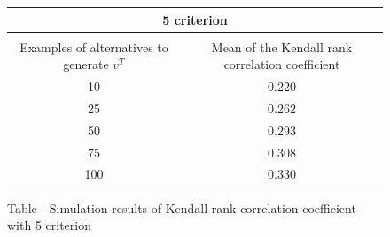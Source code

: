 \documentclass{report}
\begin{document}
\begin{figure}[H] 
\begin{center}
\begin{tabular}{ |c||c| }
 \hline
 \multicolumn{2}{|c|}{5 criterion} \\
 \hline
\\[-1em] Examples of alternatives to generate $v^T$& Mean of the Kendall rank correlation coefficient\\
 \hline
 10   & 0.220\\
 25   & 0.262\\
 50   & 0.293\\
 75   & 0.308\\
 100 & 0.330\\
 \hline
\end{tabular}
\end{center}
\caption{Table - Simulation results of Kendall rank correlation coefficient with 5 criterion}
\end{figure}
\end{document}

